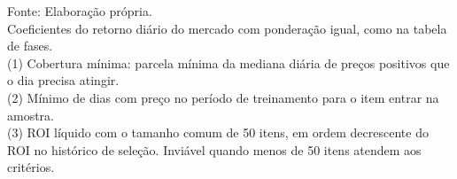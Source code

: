 \begin{minipage}{\linewidth}
Fonte: Elaboração própria.\\
Coeficientes do retorno diário do mercado com ponderação igual, como na tabela de fases.\\
(1) Cobertura mínima: parcela mínima da mediana diária de preços positivos que o dia precisa atingir.\\
(2) Mínimo de dias com preço no período de treinamento para o item entrar na amostra.\\
(3) ROI líquido com o tamanho comum de 50 itens, em ordem decrescente do ROI no histórico de seleção. Inviável quando menos de 50 itens atendem aos critérios.\\
\end{minipage}
\endgroup
